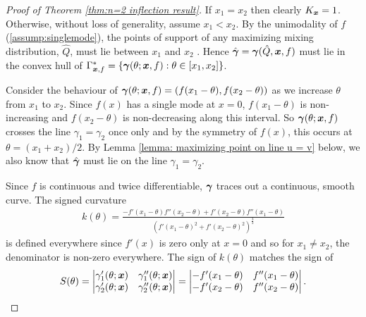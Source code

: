 		\label{sec:proof of n=2 inflection result}
		\begin{proof}[Proof of Theorem \ref{thm:n=2 inflection result}]
			If $x_1 = x_2$ then clearly $K_{\bm{{x}}} = 1$. Otherwise, without loss of generality, assume $x_1 < x_2$. By the unimodality of $f$ (\ref{assump:singlemode}), the points of support of any maximizing mixing distribution, $\hat{Q}$, must lie between $x_1$ and $x_2$ \cite[Proposition 25]{Lindsay1995-sq}. Hence $\hat{{\bm{{\gamma}}}} = {\bm{{\gamma}}}(\hat{Q}, {\bm{{x}}}, f)$ must lie in the convex hull of $\Gamma^*_{{\bm{{x}}}, f} = \{{\bm{{\gamma}}}(\theta; {\bm{{x}}}, f) : \theta \in [x_1, x_2]\}$. 

			Consider the behaviour of ${\bm{{\gamma}}}(\theta; {\bm{{x}}}, f) = (f(x_1 - \theta), f(x_2 - \theta))$ as we increase $\theta$ from $x_1$ to $x_2$. Since $f(x)$ has a single mode at $x = 0$, $f(x_1 - \theta)$ is non-increasing and $f(x_2 - \theta)$ is non-decreasing along this interval. So ${\bm{{\gamma}}}(\theta;{\bm{{x}}}, f)$ crosses the line $\gamma_1 = \gamma_2$ once only and by the symmetry of $f(x)$, this occurs at $\theta = (x_1 + x_2)/2$. By Lemma \ref{lemma: maximizing point on line u = v} below, we also know that $\hat{{\bm{{\gamma}}}}$ must lie on the line $\gamma_1 = \gamma_2$.

			Since $f$ is continuous and twice differentiable, ${\bm{{\gamma}}}$ traces out a continuous, smooth curve. The signed curvature
			\begin{align}
				k(\theta) = \frac{-f'(x_1 - \theta)f''(x_2 - \theta) + f'(x_2 - \theta)f''(x_1 - \theta)}{(f'(x_1 - \theta)^2 + f'(x_2 - \theta)^2)^{\frac{3}{2}}}
			\end{align}
			is defined everywhere since $f'(x)$ is zero only at $x = 0$ and so for $x_1 \neq x_2$, the denominator is non-zero everywhere. The sign of $k(\theta)$ matches the sign of
			\begin{equation}
				S(\theta) = 
				\begin{vmatrix}
					\gamma_1'(\theta;{\bm{{x}}})&\gamma_1''(\theta;{\bm{{x}}})\\
					\gamma_2'(\theta;{\bm{{x}}})&\gamma_2''(\theta;{\bm{{x}}})
				\end{vmatrix} = 
				\begin{vmatrix}
					-f'(x_1 - \theta) & f''(x_1 - \theta)\\
					-f'(x_2 - \theta) & f''(x_2 - \theta)
				\end{vmatrix}.
			\end{equation}


\end{proof}
